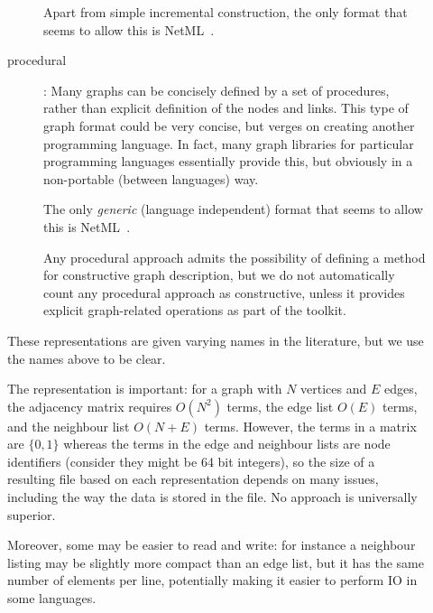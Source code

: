 \documentclass{sig-alternate}
\begin{document}
\begin{description}
\begin{description}
    Apart from simple incremental construction, the only format that
    seems to allow this is NetML~\cite{batagelj95:_towar_netml}.

  \item[procedural]: Many graphs can be concisely defined by a
    set of procedures, rather than explicit definition of the nodes
    and links. This type of graph format could be very concise, but
    verges on creating another programming language. In fact, many
    graph libraries for particular programming languages essentially
    provide this, but obviously in a non-portable (between languages)
    way. 

    The only {\em generic} (language independent) format that seems to
    allow this is NetML~\cite{batagelj95:_towar_netml}.

    Any procedural approach admits the possibility of defining a
    method for constructive graph description, but we do not
    automatically count any procedural approach as constructive, unless
    it provides explicit graph-related operations as part of the
    toolkit. 


  \end{description}
  These representations are given varying names in the literature, but
  we use the names above to be clear.

  The representation is important: for a graph with $N$ vertices and
  $E$ edges, the adjacency matrix requires $O(N^2)$ terms, the edge
  list $O(E)$ terms, and the neighbour list $O(N + E)$ terms. However,
  the terms in a matrix are $\{0,1\}$ whereas the terms in the edge
  and neighbour lists are node identifiers (consider they might be 64
  bit integers), so the size of a resulting file based on each
  representation depends on many issues, including the way the data is
  stored in the file. No approach is universally superior.

  Moreover, some may be easier to read and write: for instance a
  neighbour listing may be slightly more compact than an edge list,
  but it has the same number of elements per line, potentially making
  it easier to perform IO in some languages.


\end{description}
\end{document}
